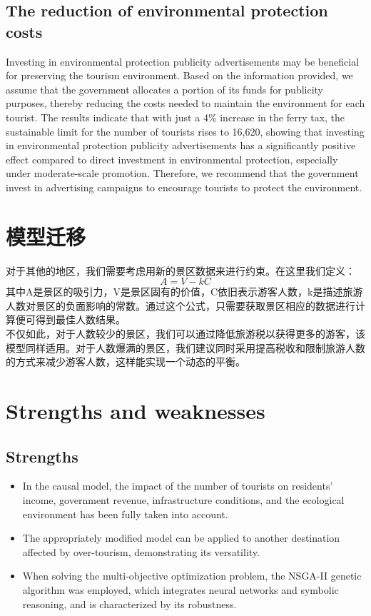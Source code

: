 \documentclass[12pt]{article}  %
\begin{document}
    \subsection{The reduction of environmental protection costs}
    Investing in environmental protection publicity advertisements may be beneficial for preserving the tourism environment. Based on the information provided, we assume that the government allocates a portion of its funds for publicity purposes, thereby reducing the costs needed to maintain the environment for each tourist. The results indicate that with just a 4\% increase in the ferry tax, the sustainable limit for the number of tourists rises to 16,620, showing that investing in environmental protection publicity advertisements has a significantly positive effect compared to direct investment in environmental protection, especially under moderate-scale promotion. Therefore, we recommend that the government invest in advertising campaigns to encourage tourists to protect the environment.
 
\section{模型迁移}
对于其他的地区，我们需要考虑用新的景区数据来进行约束。在这里我们定义：
$$A=V-kC$$
其中A是景区的吸引力，V是景区固有的价值，C依旧表示游客人数，k是描述旅游人数对景区的负面影响的常数。通过这个公式，只需要获取景区相应的数据进行计算便可得到最佳人数结果。\\
不仅如此，对于人数较少的景区，我们可以通过降低旅游税以获得更多的游客，该模型同样适用。对于人数爆满的景区，我们建议同时采用提高税收和限制旅游人数的方式来减少游客人数，这样能实现一个动态的平衡。
 \section{Strengths and weaknesses}
 
 \subsection{Strengths}
 
 \begin{itemize}
     \setlength{\parsep}{0ex} %
     \setlength{\topsep}{2ex} %
     \setlength{\itemsep}{1ex} %
     \item In the causal model, the impact of the number of tourists on residents' income, government revenue, infrastructure conditions, and the ecological environment has been fully taken into account.
     \item The appropriately modified model can be applied to another destination affected by over-tourism, demonstrating its versatility.
     \item When solving the multi-objective optimization problem, the NSGA-II genetic algorithm was employed, which integrates neural networks and symbolic reasoning, and is characterized by its robustness.
 \end{itemize}
 
\end{document}
